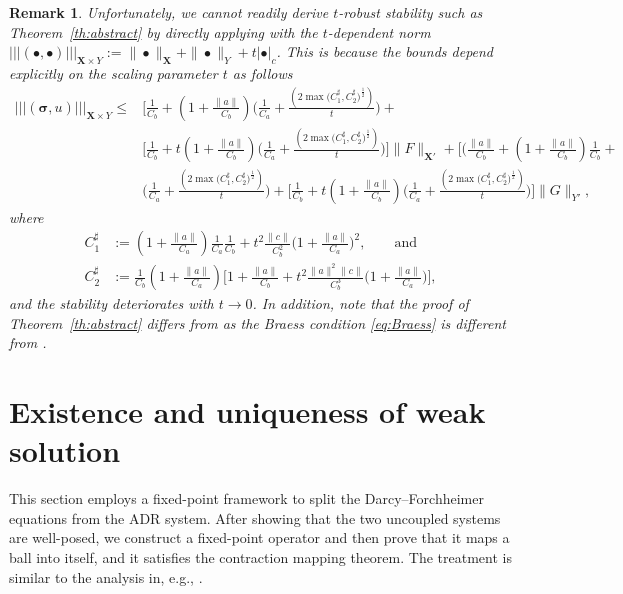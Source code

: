 \documentclass[11pt, reqno, a4paper, twoside]{article}
\newcommand*\tnorm[1]{|\!|\!| #1 |\!|\!|}
\newcommand\bsigma{\boldsymbol{\sigma}}
\newcommand{\bX}{\mathbf{X}}
\newtheorem{remark}{Remark}[section]
\numberwithin{equation}{section}
\numberwithin{remark}{section}
\numberwithin{figure}{section}
\numberwithin{table}{section}
\begin{document}
\begin{remark}
Unfortunately, we cannot readily derive   \(t\)-robust stability   such as  Theorem~\ref{th:abstract} by directly applying \cite[Theorem~3.4]{correa2022continuous} with the \(t\)-dependent norm \(\tnorm{(\bullet,\bullet)}_{\bX\times Y}:=\|\bullet\|_{\bX}+\|\bullet\|_Y+t|\bullet|_{c}\). This is  because the bounds \cite[Eq.~(3.56)-(3.58)]{correa2022continuous} depend explicitly on the scaling parameter \(t\) as follows
   \begin{align*}
       \tnorm{(\bsigma,u)}_{\bX\times Y}\leq& \bigl[\frac{1}{C_b}+(1+\frac{\|a\|}{C_b})\bigl(\frac{1}{C_a}+\frac{(2\max\bigl(C^{\sharp}_1,C^{\sharp}_2\bigr)^{\frac12})}{t}\bigr)+\\&\bigl[\frac{1}{C_b}+t(1+\frac{\|a\|}{C_b})\bigl(\frac{1}{C_a}+\frac{(2\max\bigl(C^{\sharp}_1,C^{\sharp}_2\bigr)^{\frac12})}{t}\bigr)\bigr] \|F\|_{\bX'}+ \bigl[(\frac{\|a\|}{C_b}+(1+\frac{\|a\|}{C_b})\frac{1}{C_b}+\\&\bigl(\frac{1}{C_a}+\frac{(2\max\bigl(C^{\sharp}_1,C^{\sharp}_2\bigr)^{\frac12})}{t}\bigr)+\bigl[\frac{1}{C_b}+t(1+\frac{\|a\|}{C_b})\bigl(\frac{1}{C_a}+\frac{(2\max\bigl(C^{\sharp}_1,C^{\sharp}_2\bigr)^{\frac12})}{t}\bigr)\bigr]\|G\|_{Y'},
   \end{align*}
   where \begin{align*}C^{\sharp}_1&:=(1+\frac{\|a\|}{C_a})\frac{1}{C_a}\frac{1}{C_b}+t^2\frac{\|c\|}{C_b^2}\bigl(1+\frac{\|a\|}{C_a}\bigr)^2,\qquad \text{and }\\
   C^{\sharp}_2&:=\frac{1}{C_b}(1+\frac{\|a\|}{C_a})\bigl[1+\frac{\|a\|}{C_b}+t^2\frac{\|a\|^2\|c\|}{C_b^3}\bigl(1+\frac{\|a\|}{C_a}\bigr)\bigr],
   \end{align*}
   and the stability  {deteriorates} with $t\to 0$. In addition, note that the proof of Theorem~\ref{th:abstract} differs from \cite[Lemma~3.1]{braess1996stability} as the Braess condition \eqref{eq:Braess} is different from \cite[(3.1)]{braess1996stability}.
\end{remark}

\section{Existence and uniqueness of weak solution}\label{sec:existence}
This section  employs a fixed-point framework to split the Darcy--Forchheimer equations from the ADR system. After showing that the two uncoupled systems are well-posed, we  construct a fixed-point operator and then prove that it maps a ball into itself, and it satisfies the contraction mapping theorem. The treatment is similar to the analysis in, e.g.,  \cite{caucao2021fully,correa2023new,gatica2022p}.  
\end{document}
